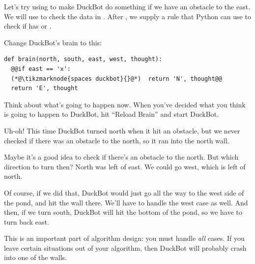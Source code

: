 Let's try using  to make DuckBot do something if we have an obstacle to the east. We will use
 to check the data in . After , we supply a rule that Python can use to
check if  has  or .

\begin{TryThisBox}
  Change DuckBot's brain to this:
  \begin{lstlisting}
def brain(north, south, east, west, thought):
  @@if east == 'x':
  (*@\tikzmarknode{spaces duckbot}{}@*)  return 'N', thought@@
  return 'E', thought
  \end{lstlisting}
\end{TryThisBox}


Think about what's going to happen now. When you've decided what you think is going to happen to
DuckBot, hit ``Reload Brain'' and start DuckBot.

Uh-oh! This time DuckBot turned north when it hit an obstacle, but we never checked if there was an obstacle to the north, so it ran into the north wall.

Maybe it's a good idea to check if there's an obstacle to the north. But which direction to turn
then? North was left of east. We could go west, which is left of north.

Of course, if we did that, DuckBot would just go all the way to the west side of the pond, and hit
the wall there. We'll have to handle the west case as well. And then, if we turn south, DuckBot will
hit the bottom of the pond, so we have to turn back east.

This is an important part of algorithm design: you must handle \emph{all} cases. If you leave
certain situations out of your algorithm, then DuckBot will probably crash into one of the walls.

